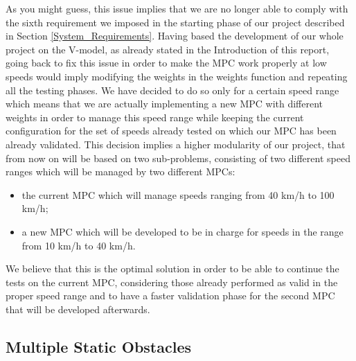 As you might guess, this issue implies that we are no longer able to comply with the sixth requirement we imposed in the starting phase of our project described in Section \ref{System_Requirements}.
Having based the development of our whole project on the V-model, as already stated in the Introduction of this report, going back to fix this issue in order to make the MPC work properly at low speeds would imply modifying the weights in the weights function and repeating all the testing phases.
We have decided to do so only for a certain speed range which means that we are actually implementing a new MPC with different weights in order to manage this speed range while keeping the current configuration for the set of speeds already tested on which our MPC has been already validated.
This decision implies a higher modularity of our project, that from now on will be based on two sub-problems, consisting of two different speed ranges which will be managed by two different MPCs: 
\begin{itemize}
    \item the current MPC which will manage speeds ranging from 40 km/h to 100 km/h;
    \item a new MPC which will be developed to be in charge for speeds in the range from 10 km/h to 40 km/h.
\end{itemize}

We believe that this is the optimal solution in order to be able to continue the tests on the current MPC, considering those already performed as valid in the proper speed range and to have a faster validation phase for the second MPC that will be developed afterwards.


\subsection{Multiple Static Obstacles}
